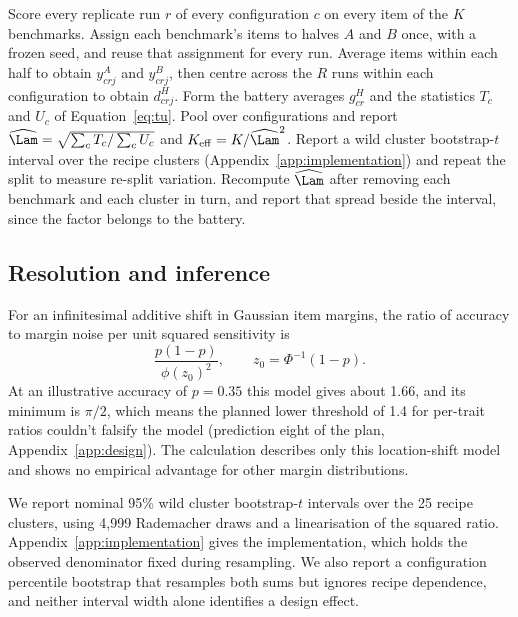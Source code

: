 \begin{algorithm}[t]
\caption{SNAP measurement recipe for a fixed battery of $K$ benchmarks scored on $R$ replicate runs per configuration. The primary analysis below used a random frozen split and checked a passage-aware split, and the registered test kept passage-linked items in one half.}
\label{alg:snap}
\begin{algorithmic}[1]
\STATE Score every replicate run $r$ of every configuration $c$ on every item of the $K$ benchmarks.
\STATE Assign each benchmark's items to halves $A$ and $B$ once, with a frozen seed, and reuse that assignment for every run.
\STATE Average items within each half to obtain $y^A_{crj}$ and $y^B_{crj}$, then centre across the $R$ runs within each configuration to obtain $d^H_{crj}$.
\STATE Form the battery averages $g^H_{cr}$ and the statistics $T_c$ and $U_c$ of Equation~\ref{eq:tu}.
\STATE Pool over configurations and report $\widehat\Lam=\sqrt{\sum_c T_c/\sum_c U_c}$ and $K_{\mathrm{eff}}=K/\widehat\Lam^2$.
\STATE Report a wild cluster bootstrap-$t$ interval over the recipe clusters (Appendix~\ref{app:implementation}) and repeat the split to measure re-split variation.
\STATE Recompute $\widehat\Lam$ after removing each benchmark and each cluster in turn, and report that spread beside the interval, since the factor belongs to the battery.
\end{algorithmic}
\end{algorithm}


\subsection{Resolution and inference}
For an infinitesimal additive shift in Gaussian item margins, the ratio of accuracy to margin noise per unit squared sensitivity is
\begin{equation}
\frac{p(1-p)}{\phi(z_0)^2},\qquad z_0=\Phi^{-1}(1-p).
\end{equation}
At an illustrative accuracy of $p=0.35$ this model gives about 1.66, and its minimum is $\pi/2$, which means the planned lower threshold of 1.4 for per-trait ratios couldn't falsify the model (prediction eight of the plan, Appendix~\ref{app:design}). The calculation describes only this location-shift model and shows no empirical advantage for other margin distributions.

We report nominal 95\% wild cluster bootstrap-$t$ intervals over the 25 recipe clusters, using 4,999 Rademacher draws and a linearisation of the squared ratio. Appendix~\ref{app:implementation} gives the implementation, which holds the observed denominator fixed during resampling. We also report a configuration percentile bootstrap that resamples both sums but ignores recipe dependence, and neither interval width alone identifies a design effect.

